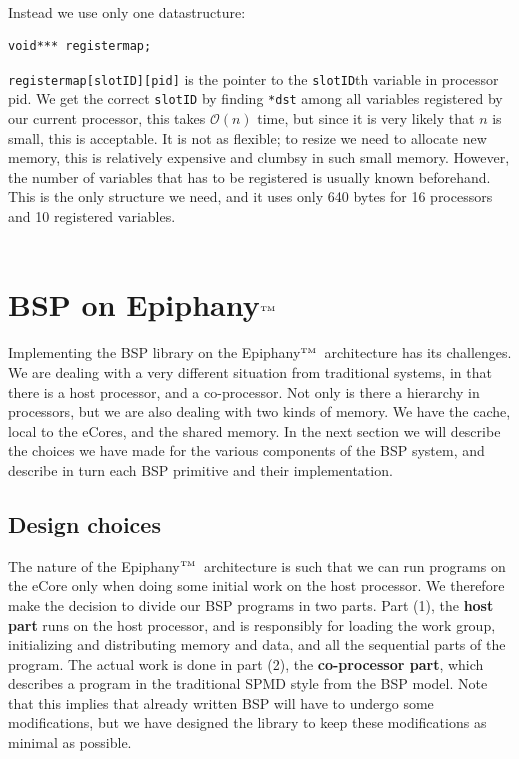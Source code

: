 \documentclass[fleqn]{article}
\renewcommand{\(}{\left(}
\renewcommand{\)}{\right)}
\def\tm{$^{\hbox{\tiny TM}}$~}
\begin{document}
\\
Instead we use only one datastructure:
\begin{lstlisting}
void*** registermap;
\end{lstlisting}
\texttt{registermap[slotID][pid]} is the pointer to the \texttt{slotID}th variable in processor pid.
We get the correct \texttt{slotID} by finding \texttt{*dst} among all variables registered by our current processor, this takes $\mathcal{O}(n)$ time, but since it is very likely that $n$ is small, this is acceptable. It is not as flexible; to resize we need to allocate new memory, this is relatively expensive and clumbsy in such small memory. However, the number of variables that has to be registered is usually known beforehand. This is the only structure we need, and it uses only 640 bytes for 16 processors and 10 registered variables.\\
\\


\section{BSP on Epiphany\tm}

Implementing the BSP library on the Epiphany\tm architecture has its challenges. We are dealing with a very different situation from traditional systems, in that there is a host processor, and a co-processor. Not only is there a hierarchy in processors, but we are also dealing with two kinds of memory. We have the cache, local to the eCores, and the shared memory. In the next section we will describe the choices we have made for the various components of the BSP system, and describe in turn each BSP primitive and their implementation.

\subsection{Design choices}

The nature of the Epiphany\tm architecture is such that we can run programs on the eCore only when doing some initial work on the host processor. We therefore make the decision to divide our BSP programs in two parts. Part (1), the \textbf{host part} runs on the host processor, and is responsibly for loading the work group, initializing and distributing memory and data, and all the sequential parts of the program. The actual work is done in part (2), the \textbf{co-processor part}, which describes a program in the traditional SPMD style from the BSP model. Note that this implies that already written BSP will have to undergo some modifications, but we have designed the library to keep these modifications as minimal as possible.
\end{document}
